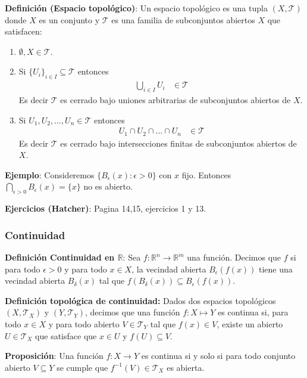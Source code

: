 \textbf{Definición (Espacio topológico)}: Un espacio topológico es una tupla $(X, \mathcal{T})$ donde $X$ es un conjunto y $\mathcal{T}$ es una familia de subconjuntos abiertos $X$ que satisfacen:
\begin{enumerate}
    \item $\emptyset, X \in \mathcal{T}$.
    \item Si $\{U_i\}_{i \in I} \subseteq \mathcal{T}$ entonces
    \begin{align*}
        \bigcup_{i \in I} U_i &\in \mathcal{T}
    \end{align*}
    Es decir $\mathcal {T}$ es cerrado bajo uniones arbitrarias de subconjuntos abiertos de $X$.
    \item Si $U_1, U_2, \dots, U_n \in \mathcal{T}$ entonces
    \begin{align*}
        U_1 \cap U_2 \cap \dots \cap U_n &\in \mathcal{T}
    \end{align*}
    Es decir $\mathcal {T}$ es cerrado bajo intersecciones finitas de subconjuntos abiertos de $X$.
\end{enumerate}
\textbf{Ejemplo}: Consideremos $\{B_\epsilon(x): \epsilon > 0\}$ con $x$ fijo. Entonces $\bigcap_{\epsilon>0} B_{\epsilon}(x) = \{x\}$ no es abierto.

\textbf{Ejercicios (Hatcher)}: Pagina 14,15, ejercicios 1 y 13.

\subsubsection{Continuidad}

\textbf{Definición Continuidad en $\mathbb{R}$}: Sea $f: \mathbb{R}^n \to \mathbb{R}^m$ una función. Decimos que $f$ si para todo $\epsilon > 0$ y para todo $x \in X$, la vecindad abierta $B_\epsilon(f(x))$ tiene una vecindad abierta $B_\delta(x)$ tal que $f(B_\delta(x)) \subseteq B_\epsilon(f(x))$.

\textbf{Definición topológica de continuidad:} Dados dos espacios topológicos $(X, \mathcal{T}_X)$ y $(Y, \mathcal{T}_Y)$, decimos que una función $f:X \mapsto Y$ es continua si, para todo $x \in X$ y para todo abierto $V \in \mathcal{T}_Y$ tal que $f(x) \in V$, existe un abierto $U \in \mathcal{T}_X$ que satisface que $x \in U$ y $f(U) \subseteq V$.

\textbf{Proposición}: Una función $f: X \to Y$ es continua si y solo si para todo conjunto abierto $V \subseteq Y$ se cumple que $f^{-1}(V) \in \mathcal{T}_X$ es abierta.

